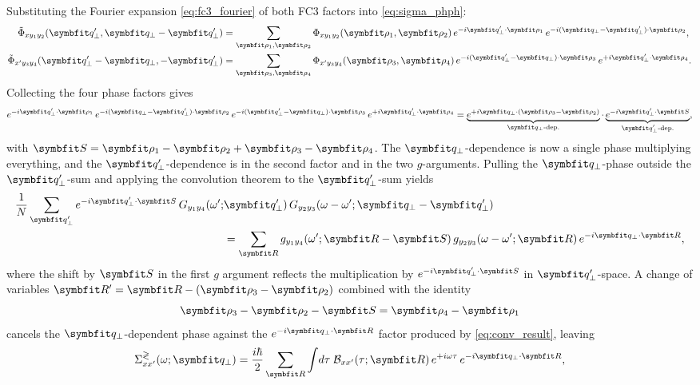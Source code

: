 Substituting the Fourier expansion \cref{eq:fc3_fourier} of both
FC3 factors into \cref{eq:sigma_phph}:
\begin{align}
  \tilde\Phi_{xy_1y_2}(\qp',\qp-\qp')
  &= \sum_{\vc{\rho}_1,\vc{\rho}_2}
     \Phi_{xy_1y_2}(\vc{\rho}_1,\vc{\rho}_2)\,
     e^{-i\qp'\cdot\vc{\rho}_1}\,
     e^{-i(\qp-\qp')\cdot\vc{\rho}_2},
  \label{eq:v1_expand}\\
  \tilde\Phi_{x'y_3y_4}(\qp'-\qp,-\qp')
  &= \sum_{\vc{\rho}_3,\vc{\rho}_4}
     \Phi_{x'y_3y_4}(\vc{\rho}_3,\vc{\rho}_4)\,
     e^{-i(\qp'-\qp)\cdot\vc{\rho}_3}\,
     e^{+i\qp'\cdot\vc{\rho}_4}.
  \label{eq:v2_expand}
\end{align}
Collecting the four phase factors gives
\begin{equation}\label{eq:phases_combined}
  e^{-i\qp'\cdot\vc{\rho}_1}\,e^{-i(\qp-\qp')\cdot\vc{\rho}_2}\,
  e^{-i(\qp'-\qp)\cdot\vc{\rho}_3}\,e^{+i\qp'\cdot\vc{\rho}_4}
  =
  \underbrace{e^{+i\qp\cdot(\vc{\rho}_3-\vc{\rho}_2)}}_{\text{$\qp$-dep.}}
  \cdot
  \underbrace{e^{-i\qp'\cdot\vc{S}}}_{\text{$\qp'$-dep.}},
\end{equation}
with $\vc{S} = \vc{\rho}_1 - \vc{\rho}_2 + \vc{\rho}_3 - \vc{\rho}_4$.
The $\qp$-dependence is now a single phase
multiplying everything, and the $\qp'$-dependence is
in the second factor and in the two $g$-arguments. Pulling the
$\qp$-phase outside the $\qp'$-sum and applying the convolution
theorem to the $\qp'$-sum yields
\begin{equation}\label{eq:conv_result}
\begin{aligned}
  \frac{1}{N}\sum_{\qp'} e^{-i\qp'\cdot\vc{S}}\,
  G_{y_1y_4}(\omega';&\qp')\,G_{y_2y_3}(\omega-\omega';\qp-\qp')\\
  &= \sum_{\vR}
    g_{y_1y_4}(\omega';\vR-\vc{S})\,
    g_{y_2y_3}(\omega-\omega';\vR)\,e^{-i\qp\cdot\vR},
\end{aligned}
\end{equation}
where the shift by $\vc{S}$ in the first $g$ argument reflects the
multiplication by $e^{-i\qp'\cdot\vc{S}}$ in $\qp'$-space. A change
of variables $\vR' = \vR - (\vc{\rho}_3 - \vc{\rho}_2)$ combined
with the identity
\begin{equation}
  \vc{\rho}_3 - \vc{\rho}_2 - \vc{S}
  = \vc{\rho}_4 - \vc{\rho}_1
\end{equation}
cancels the $\qp$-dependent phase against the $e^{-i\qp\cdot\vR}$
factor produced by \cref{eq:conv_result}, leaving
\begin{equation}\label{eq:sigma_realspace}
  \Sigma_{xx'}^{\gtrless}(\omega;\qp)
  = \frac{i\hbar}{2}
    \sum_{\vR}\int\!d\tau\;
    \mathcal{B}_{xx'}(\tau;\vR)\,e^{+i\omega\tau}\,e^{-i\qp\cdot\vR},
\end{equation}
